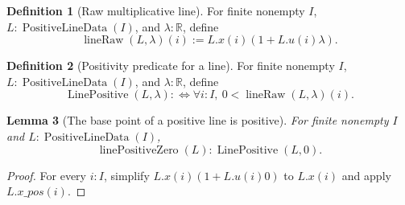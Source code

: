 \documentclass[9pt]{extarticle}
\newtheorem{lemma}{Lemma}[section]
\theoremstyle{definition}
\newtheorem{definition}[lemma]{Definition}
\theoremstyle{remark}
\newcommand{\R}{\mathbb R}
\begin{document}
\begin{definition}[Raw multiplicative line]
\label{def:positive-line-raw}
For finite nonempty $I$, $L:\operatorname{PositiveLineData}(I)$, and
$\lambda:\R$, define
\begin{equation}
 \operatorname{lineRaw}(L,\lambda)(i):=
 L.x(i)(1+L.u(i)\lambda).
 \label{eq:multiplicative-line}
\end{equation}
\end{definition}

\begin{definition}[Positivity predicate for a line]
\label{def:positive-line-predicate}
For finite nonempty $I$, $L:\operatorname{PositiveLineData}(I)$, and
$\lambda:\R$, define
\[
 \operatorname{LinePositive}(L,\lambda):\Longleftrightarrow
 \forall i:I,\ 0<\operatorname{lineRaw}(L,\lambda)(i).
\]
\end{definition}

\begin{lemma}[The base point of a positive line is positive]
\label{lem:line-positive-zero}
For finite nonempty $I$ and $L:\operatorname{PositiveLineData}(I)$,
\[
 \operatorname{linePositiveZero}(L):\operatorname{LinePositive}(L,0).
\]
\end{lemma}

\begin{proof}
For every $i:I$, simplify
$L.x(i)(1+L.u(i)0)$ to $L.x(i)$ and apply $L.x\_pos(i)$.
\end{proof}
\end{document}
